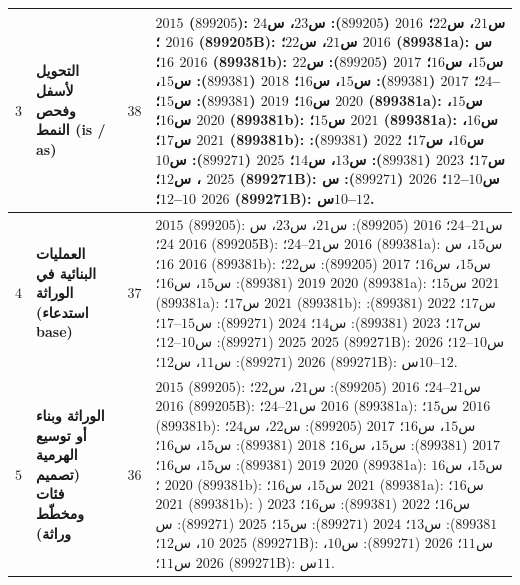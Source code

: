 \documentclass[14pt]{extarticle}
\begin{document}
{\begin{longtable}{|C{0.05\textwidth}|>{\raggedleft\arraybackslash}p{0.27\textwidth}|C{0.09\textwidth}|>{\raggedleft\arraybackslash}p{0.47\textwidth}|}
$3$ &
\textbf{التحويل لأسفل وفحص النمط (\textenglish{is} / \textenglish{as})} &
\textbf{$38$} &
$2015$ ($899205$): س$21$، س$22$؛
$2016$ ($899205$): س$23$، س$24$؛
$2016$ (\textenglish{899205B}): س$21$، س$22$؛
$2016$ (\textenglish{899381a}): س$16$؛
$2016$ (\textenglish{899381b}): س$15$، س$16$؛
$2017$ ($899205$): س$22$--$24$؛
$2017$ ($899381$): س$15$، س$16$؛
$2018$ ($899381$): س$15$، س$16$؛
$2019$ ($899381$): س$15$؛
$2020$ (\textenglish{899381a}): س$15$، س$16$؛
$2020$ (\textenglish{899381b}): س$15$؛
$2021$ (\textenglish{899381a}): س$16$، س$17$؛
$2021$ (\textenglish{899381b}): س$16$، س$17$؛
$2022$ ($899381$): س$17$؛
$2023$ ($899381$): س$13$، س$14$؛
$2025$ ($899271$): س$10$، س$12$؛
$2025$ (\textenglish{899271B}): س$10$--$12$؛
$2026$ ($899271$): س$10$--$12$؛
$2026$ (\textenglish{899271B}): س$10$--$12$. \\
\hline

$4$ &
\textbf{العمليات البنائية في الوراثة (استدعاء \textenglish{base})} &
\textbf{$37$} &
$2015$ ($899205$): س$21$--$24$؛
$2016$ ($899205$): س$21$، س$23$، س$24$؛
$2016$ (\textenglish{899205B}): س$21$--$24$؛
$2016$ (\textenglish{899381a}): س$15$، س$16$؛
$2016$ (\textenglish{899381b}): س$15$، س$16$؛
$2017$ ($899205$): س$22$؛
$2019$ ($899381$): س$15$، س$16$؛
$2020$ (\textenglish{899381a}): س$15$؛
$2021$ (\textenglish{899381a}): س$17$؛
$2021$ (\textenglish{899381b}): س$17$؛
$2022$ ($899381$): س$17$؛
$2023$ ($899381$): س$14$؛
$2024$ ($899271$): س$15$--$17$؛
$2025$ ($899271$): س$10$--$12$؛
$2025$ (\textenglish{899271B}): س$10$--$12$؛
$2026$ ($899271$): س$11$، س$12$؛
$2026$ (\textenglish{899271B}): س$10$--$12$. \\
\hline

$5$ &
\textbf{الوراثة وبناء أو توسيع الهرمية (تصميم فئات ومخطّط وراثة)} &
\textbf{$36$} &
$2015$ ($899205$): س$21$--$24$؛
$2016$ ($899205$): س$21$، س$22$؛
$2016$ (\textenglish{899205B}): س$21$--$24$؛
$2016$ (\textenglish{899381a}): س$15$؛
$2016$ (\textenglish{899381b}): س$15$، س$16$؛
$2017$ ($899205$): س$22$، س$24$؛
$2017$ ($899381$): س$15$، س$16$؛
$2018$ ($899381$): س$15$، س$16$؛
$2019$ ($899381$): س$15$، س$16$؛
$2020$ (\textenglish{899381a}): س$15$، س$16$؛
$2020$ (\textenglish{899381b}): س$15$، س$16$؛
$2021$ (\textenglish{899381a}): س$16$؛
$2021$ (\textenglish{899381b}): س$16$؛
$2022$ ($899381$): س$16$؛
$2023$ ($899381$): س$13$؛
$2024$ ($899271$): س$15$؛
$2025$ ($899271$): س$10$، س$12$؛
$2025$ (\textenglish{899271B}): س$11$؛
$2026$ ($899271$): س$10$، س$11$؛
$2026$ (\textenglish{899271B}): س$11$. \\
\hline


\end{longtable}}
\end{document}
